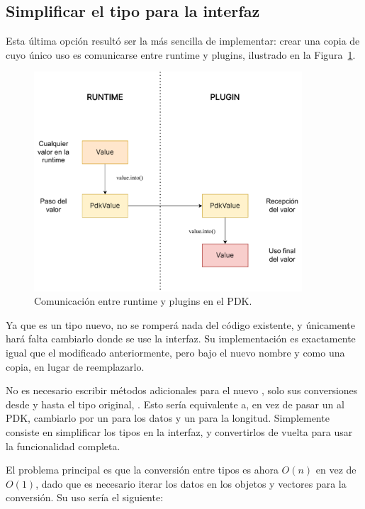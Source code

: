 \subsection{Simplificar el tipo para la interfaz}

Esta última opción resultó ser la más sencilla de implementar: crear una copia
de  cuyo único uso es comunicarse entre runtime y plugins, ilustrado
en la Figura~\ref{fig:simplify}.

\begin{figure}
    \centering
    \includegraphics[width=10cm]{./Imagenes/simplify.pdf}
    \caption{Comunicación entre runtime y plugins en el PDK.}%
    \label{fig:simplify}
\end{figure}

Ya que es un tipo nuevo, no se romperá nada del código existente, y únicamente
hará falta cambiarlo donde se use la interfaz. Su implementación es exactamente
igual que el  modificado anteriormente, pero bajo el nuevo nombre
 y como una copia, en lugar de reemplazarlo.

No es necesario escribir métodos adicionales para el nuevo , solo
sus conversiones desde y hasta el tipo original, . Esto sería
equivalente a, en vez de pasar un  al PDK, cambiarlo por un
 para los datos y un  para la longitud. Simplemente
consiste en simplificar los tipos en la interfaz, y convertirlos de vuelta para
usar la funcionalidad completa.

El problema principal es que la conversión entre tipos es ahora $O(n)$ en vez de
$O(1)$, dado que es necesario iterar los datos en los objetos y vectores para la
conversión. Su uso sería el siguiente:

